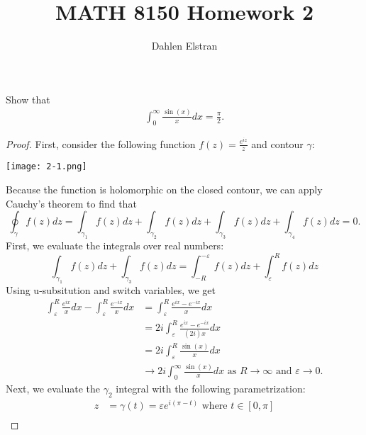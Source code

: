 \documentclass[12pt]{article}
\newenvironment{statement}[2][Statement]{\begin{trivlist}
\item[\hskip \labelsep {\bfseries #1}\hskip \labelsep {\bfseries #2.}]}{\end{trivlist}}
\begin{document}
 
\title{MATH 8150 Homework 2} 
\author{Dahlen Elstran} 
\maketitle

\begin{statement}[Problem]{(Stein) 2}
  Show that 
  \begin{align*}
    \int^{\infty}_0 \frac{\sin(x)}{x} dx=\frac{\pi}{2}.
  \end{align*}
\end{statement}
\begin{proof}
  First, consider the following function $f(z)=\frac{e^{iz}}{z}$ and contour $\gamma$:
    \begin{center} \texttt{[image: 2-1.png]} \end{center}
  Because the function is holomorphic on the closed contour, we can apply Cauchy's theorem to find that 
  \begin{equation*}
    \oint_{\gamma} f(z)dz = \int_{\gamma_1} f(z)dz + \int_{\gamma_2} f(z)dz + \int_{\gamma_3} f(z)dz +\int_{\gamma_4} f(z)dz = 0.
  \end{equation*}
  First, we evaluate the integrals over real numbers:
  \begin{equation*}
    \int_{\gamma_1} f(z)dz + \int_{\gamma_3} f(z)dz = \int_{-R}^{-\varepsilon} f(z)dz + \int_{\varepsilon}^{R} f(z)dz
  \end{equation*}
  Using u-subsitution and switch variables, we get 
  \begin{align*}
    \int^R_{\varepsilon} \frac{e^{ix}}{x}dx - \int^R_{\varepsilon} \frac{e^{-ix}}{x}dx &= \int^R_{\varepsilon} \frac{e^{ix}-e^{-ix}}{x}dx \\
                                                                                       &= 2i \int^R_{\varepsilon} \frac{e^{ix}-e^{-ix}}{(2i)x}dx \\
                                                                                       &= 2i \int^R_{\varepsilon} \frac{\sin (x)}{x}dx \\
                                                                                       & \to 2i \int^{\infty}_0 \frac{\sin (x)}{x}dx \text{ as } R \to \infty \text{ and } \varepsilon \to 0.
  \end{align*}
  Next, we evaluate the $\gamma_2$ integral with the following parametrization: 
  \begin{align*}
    z &=\gamma (t)= \varepsilon e^{i(\pi - t)} \text{ where } t \in [0,\pi]\\

\end{align*}
\end{proof}
\end{document}
